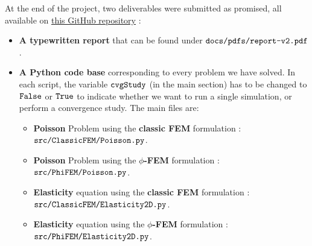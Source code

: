 At the end of the project, two deliverables were submitted as promised, all available on \href{https://github.com/master-csmi/2020-m2-mimesis}{this GitHub repository} :
\begin{itemize}
    \item \textbf{A typewritten report} that can be found under $\verb|docs/pdfs/report-v2.pdf|$.
    \item \textbf{A Python code base} corresponding to every problem we have solved. In each script, the variable  $\verb|cvgStudy|$ (in the main section) has to be changed to $\verb|False|$ or $\verb|True|$ to indicate whether we want to run a single simulation, or perform a convergence study. The main files are: \begin{itemize}
        \item \textbf{Poisson} Problem using the \textbf{classic FEM} formulation : $\verb|src/ClassicFEM/Poisson.py|$.
        \item \textbf{Poisson} Problem using the \textbf{$\phi$-FEM} formulation : $\verb|src/PhiFEM/Poisson.py|$.
        \item \textbf{Elasticity} equation using the \textbf{classic FEM} formulation : $\verb|src/ClassicFEM/Elasticity2D.py|$.
        \item \textbf{Elasticity} equation using the \textbf{$\phi$-FEM} formulation : $\verb|src/PhiFEM/Elasticity2D.py|$.
    \end{itemize}
\end{itemize} 
